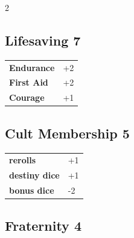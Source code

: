 \begin{multicols}{2}
\begin{tcolorbox}

\end{tcolorbox}

\begin{tcolorbox}
    \subsection*{Lifesaving \hfill \small{7 }}
    \tcblower




\begin{tabular}{@{}ll@{}}
    \textbf{Endurance} & +2\\
    \textbf{First Aid} & +2\\
    \textbf{Courage} & +1\\
\end{tabular}


\end{tcolorbox}

\begin{tcolorbox}
    \subsection*{Cult Membership \hfill \small{5 }}
    \tcblower




\begin{tabular}{@{}ll@{}}
    \textbf{rerolls} & +1\\
    \textbf{destiny dice} & +1\\
    \textbf{bonus dice} & -2\\
\end{tabular}


\end{tcolorbox}

\begin{tcolorbox}
    \subsection*{Fraternity \hfill \small{4 }}
    \tcblower





\end{tcolorbox}
\end{multicols}
